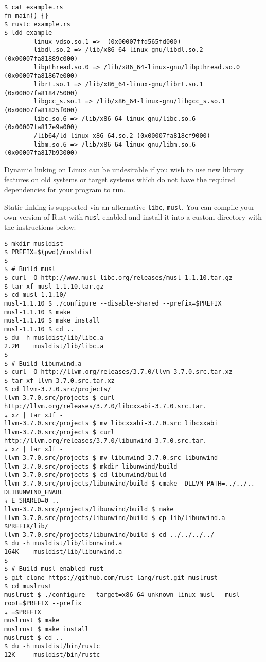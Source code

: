 \documentclass[a4paper,]{book}
\begin{document}
\begin{verbatim}
$ cat example.rs
fn main() {}
$ rustc example.rs
$ ldd example
        linux-vdso.so.1 =>  (0x00007ffd565fd000)
        libdl.so.2 => /lib/x86_64-linux-gnu/libdl.so.2 (0x00007fa81889c000)
        libpthread.so.0 => /lib/x86_64-linux-gnu/libpthread.so.0 (0x00007fa81867e000)
        librt.so.1 => /lib/x86_64-linux-gnu/librt.so.1 (0x00007fa818475000)
        libgcc_s.so.1 => /lib/x86_64-linux-gnu/libgcc_s.so.1 (0x00007fa81825f000)
        libc.so.6 => /lib/x86_64-linux-gnu/libc.so.6 (0x00007fa817e9a000)
        /lib64/ld-linux-x86-64.so.2 (0x00007fa818cf9000)
        libm.so.6 => /lib/x86_64-linux-gnu/libm.so.6 (0x00007fa817b93000)
\end{verbatim}

Dynamic linking on Linux can be undesirable if you wish to use new
library features on old systems or target systems which do not have the
required dependencies for your program to run.

Static linking is supported via an alternative \texttt{libc},
\texttt{musl}. You can compile your own version of Rust with
\texttt{musl} enabled and install it into a custom directory with the
instructions below:

\begin{verbatim}
$ mkdir musldist
$ PREFIX=$(pwd)/musldist
$
$ # Build musl
$ curl -O http://www.musl-libc.org/releases/musl-1.1.10.tar.gz
$ tar xf musl-1.1.10.tar.gz
$ cd musl-1.1.10/
musl-1.1.10 $ ./configure --disable-shared --prefix=$PREFIX
musl-1.1.10 $ make
musl-1.1.10 $ make install
musl-1.1.10 $ cd ..
$ du -h musldist/lib/libc.a
2.2M    musldist/lib/libc.a
$
$ # Build libunwind.a
$ curl -O http://llvm.org/releases/3.7.0/llvm-3.7.0.src.tar.xz
$ tar xf llvm-3.7.0.src.tar.xz
$ cd llvm-3.7.0.src/projects/
llvm-3.7.0.src/projects $ curl http://llvm.org/releases/3.7.0/libcxxabi-3.7.0.src.tar.
↳ xz | tar xJf -
llvm-3.7.0.src/projects $ mv libcxxabi-3.7.0.src libcxxabi
llvm-3.7.0.src/projects $ curl http://llvm.org/releases/3.7.0/libunwind-3.7.0.src.tar.
↳ xz | tar xJf -
llvm-3.7.0.src/projects $ mv libunwind-3.7.0.src libunwind
llvm-3.7.0.src/projects $ mkdir libunwind/build
llvm-3.7.0.src/projects $ cd libunwind/build
llvm-3.7.0.src/projects/libunwind/build $ cmake -DLLVM_PATH=../../.. -DLIBUNWIND_ENABL
↳ E_SHARED=0 ..
llvm-3.7.0.src/projects/libunwind/build $ make
llvm-3.7.0.src/projects/libunwind/build $ cp lib/libunwind.a $PREFIX/lib/
llvm-3.7.0.src/projects/libunwind/build $ cd ../../../../
$ du -h musldist/lib/libunwind.a
164K    musldist/lib/libunwind.a
$
$ # Build musl-enabled rust
$ git clone https://github.com/rust-lang/rust.git muslrust
$ cd muslrust
muslrust $ ./configure --target=x86_64-unknown-linux-musl --musl-root=$PREFIX --prefix
↳ =$PREFIX
muslrust $ make
muslrust $ make install
muslrust $ cd ..
$ du -h musldist/bin/rustc
12K     musldist/bin/rustc
\end{verbatim}
\end{document}
